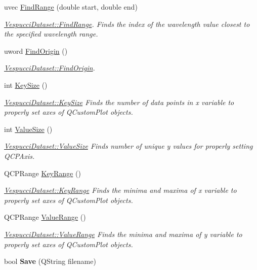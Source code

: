 \begin{DoxyCompactItemize}
\item 
uvec \hyperlink{class_vespucci_dataset_abb3bb39b5386bf5bdafd3117d9fed059}{Find\+Range} (double start, double end)
\begin{DoxyCompactList}\small\item\em \hyperlink{class_vespucci_dataset_abb3bb39b5386bf5bdafd3117d9fed059}{Vespucci\+Dataset\+::\+Find\+Range}. Finds the index of the wavelength value closest to the specified wavelength range. \end{DoxyCompactList}\item 
uword \hyperlink{class_vespucci_dataset_af4188669d80c1595fb2eeb20c4e777fd}{Find\+Origin} ()
\begin{DoxyCompactList}\small\item\em \hyperlink{class_vespucci_dataset_af4188669d80c1595fb2eeb20c4e777fd}{Vespucci\+Dataset\+::\+Find\+Origin}. \end{DoxyCompactList}\item 
int \hyperlink{class_vespucci_dataset_a9498294b2403dec1d12b56db0ba17ab3}{Key\+Size} ()
\begin{DoxyCompactList}\small\item\em \hyperlink{class_vespucci_dataset_a9498294b2403dec1d12b56db0ba17ab3}{Vespucci\+Dataset\+::\+Key\+Size} Finds the number of data points in x variable to properly set axes of Q\+Custom\+Plot objects. \end{DoxyCompactList}\item 
int \hyperlink{class_vespucci_dataset_ae8a121fd6312fb76cb545486e01b0910}{Value\+Size} ()
\begin{DoxyCompactList}\small\item\em \hyperlink{class_vespucci_dataset_ae8a121fd6312fb76cb545486e01b0910}{Vespucci\+Dataset\+::\+Value\+Size} Finds number of unique y values for properly setting Q\+C\+P\+Axis. \end{DoxyCompactList}\item 
Q\+C\+P\+Range \hyperlink{class_vespucci_dataset_a629addf6a7281a63db495a116aa5acd5}{Key\+Range} ()
\begin{DoxyCompactList}\small\item\em \hyperlink{class_vespucci_dataset_a629addf6a7281a63db495a116aa5acd5}{Vespucci\+Dataset\+::\+Key\+Range} Finds the minima and maxima of x variable to properly set axes of Q\+Custom\+Plot objects. \end{DoxyCompactList}\item 
Q\+C\+P\+Range \hyperlink{class_vespucci_dataset_aa7e9174b8509f4359134794050b2aae8}{Value\+Range} ()
\begin{DoxyCompactList}\small\item\em \hyperlink{class_vespucci_dataset_aa7e9174b8509f4359134794050b2aae8}{Vespucci\+Dataset\+::\+Value\+Range} Finds the minima and maxima of y variable to properly set axes of Q\+Custom\+Plot objects. \end{DoxyCompactList}\item 
\hypertarget{class_vespucci_dataset_a7be76ea62f7f2119a0f3eeb0fbc92d02}{bool {\bfseries Save} (Q\+String filename)}\label{class_vespucci_dataset_a7be76ea62f7f2119a0f3eeb0fbc92d02}


\end{DoxyCompactItemize}
